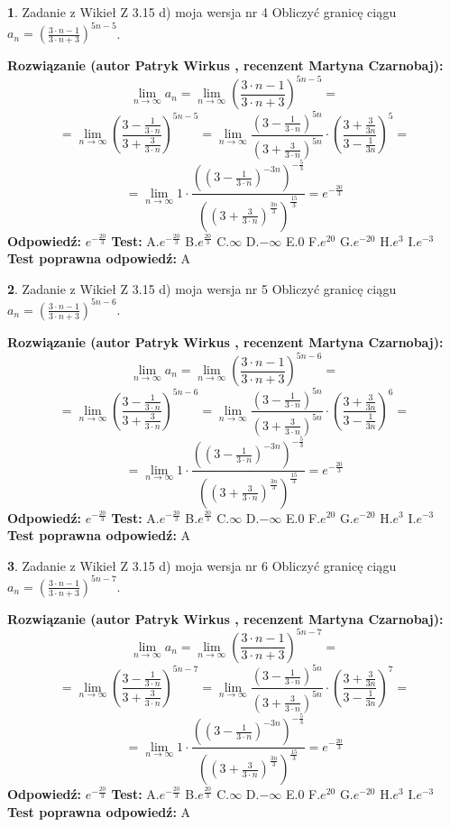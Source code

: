 \documentclass[12pt, a4paper]{article}
\theoremstyle{definition} %
\newtheorem{zad}{}
\newcommand{\zadStart}[1]{\begin{zad}#1\newline}
\newcommand{\zadStop}{\end{zad}}
\newcommand{\rozwStart}[2]{\noindent \textbf{Rozwiązanie (autor #1 , recenzent #2): }\newline}
\newcommand{\rozwStop}{\newline}
\newcommand{\odpStart}{\noindent \textbf{Odpowiedź:}\newline}
\newcommand{\odpStop}{\newline}
\newcommand{\testStart}{\noindent \textbf{Test:}\newline}
\newcommand{\testStop}{\newline}
\newcommand{\kluczStart}{\noindent \textbf{Test poprawna odpowiedź:}\newline}
\newcommand{\kluczStop}{\newline}
\begin{document}
\zadStart{Zadanie z Wikieł Z 3.15 d) moja wersja nr 4}
Obliczyć granicę ciągu $a_{n}=(\frac{3\cdot n - 1}{3 \cdot n + 3})^{5n-5}$.
\zadStop
\rozwStart{Patryk Wirkus}{Martyna Czarnobaj}
$$\lim\limits_{n\to\infty} a_{n} = \lim\limits_{n\to\infty}(\frac{3\cdot n - 1}{3 \cdot n + 3})^{5n-5}=$$
$$=\lim\limits_{n\to\infty}(\frac{3 - \frac{1}{3\cdot n}}{3 + \frac{3}{3 \cdot n}})^{5n-5}=\lim\limits_{n\to\infty}\frac{(3 - \frac{1}{3\cdot n})^{5n}}{(3 + \frac{3}{3\cdot n})^{5n}} \cdot (\frac{3+\frac{3}{3n}}{3-\frac{1}{3n}})^{5}=$$
$$=\lim\limits_{n\to\infty} 1 \cdot \frac{((3-\frac{1}{3 \cdot n})^{-3n})^{-\frac{5}{3}}}{((3+\frac{3}{3 \cdot n})^{\frac{3n}{3}})^{\frac{15}{3}}} =e^{-\frac{20}{3}}$$
\rozwStop
\odpStart
$e^{-\frac{20}{3}}$
\odpStop
\testStart
A.$ e^{-\frac{20}{3}}$
B.$ e^{\frac{20}{3}}$
C.$\infty$
D.$-\infty$
E.$0$
F.$e^{20}$
G.$e^{-20}$
H.$e^{3}$
I.$e^{-3}$
\testStop
\kluczStart
A
\kluczStop



\zadStart{Zadanie z Wikieł Z 3.15 d) moja wersja nr 5}
Obliczyć granicę ciągu $a_{n}=(\frac{3\cdot n - 1}{3 \cdot n + 3})^{5n-6}$.
\zadStop
\rozwStart{Patryk Wirkus}{Martyna Czarnobaj}
$$\lim\limits_{n\to\infty} a_{n} = \lim\limits_{n\to\infty}(\frac{3\cdot n - 1}{3 \cdot n + 3})^{5n-6}=$$
$$=\lim\limits_{n\to\infty}(\frac{3 - \frac{1}{3\cdot n}}{3 + \frac{3}{3 \cdot n}})^{5n-6}=\lim\limits_{n\to\infty}\frac{(3 - \frac{1}{3\cdot n})^{5n}}{(3 + \frac{3}{3\cdot n})^{5n}} \cdot (\frac{3+\frac{3}{3n}}{3-\frac{1}{3n}})^{6}=$$
$$=\lim\limits_{n\to\infty} 1 \cdot \frac{((3-\frac{1}{3 \cdot n})^{-3n})^{-\frac{5}{3}}}{((3+\frac{3}{3 \cdot n})^{\frac{3n}{3}})^{\frac{15}{3}}} =e^{-\frac{20}{3}}$$
\rozwStop
\odpStart
$e^{-\frac{20}{3}}$
\odpStop
\testStart
A.$ e^{-\frac{20}{3}}$
B.$ e^{\frac{20}{3}}$
C.$\infty$
D.$-\infty$
E.$0$
F.$e^{20}$
G.$e^{-20}$
H.$e^{3}$
I.$e^{-3}$
\testStop
\kluczStart
A
\kluczStop



\zadStart{Zadanie z Wikieł Z 3.15 d) moja wersja nr 6}
Obliczyć granicę ciągu $a_{n}=(\frac{3\cdot n - 1}{3 \cdot n + 3})^{5n-7}$.
\zadStop
\rozwStart{Patryk Wirkus}{Martyna Czarnobaj}
$$\lim\limits_{n\to\infty} a_{n} = \lim\limits_{n\to\infty}(\frac{3\cdot n - 1}{3 \cdot n + 3})^{5n-7}=$$
$$=\lim\limits_{n\to\infty}(\frac{3 - \frac{1}{3\cdot n}}{3 + \frac{3}{3 \cdot n}})^{5n-7}=\lim\limits_{n\to\infty}\frac{(3 - \frac{1}{3\cdot n})^{5n}}{(3 + \frac{3}{3\cdot n})^{5n}} \cdot (\frac{3+\frac{3}{3n}}{3-\frac{1}{3n}})^{7}=$$
$$=\lim\limits_{n\to\infty} 1 \cdot \frac{((3-\frac{1}{3 \cdot n})^{-3n})^{-\frac{5}{3}}}{((3+\frac{3}{3 \cdot n})^{\frac{3n}{3}})^{\frac{15}{3}}} =e^{-\frac{20}{3}}$$
\rozwStop
\odpStart
$e^{-\frac{20}{3}}$
\odpStop
\testStart
A.$ e^{-\frac{20}{3}}$
B.$ e^{\frac{20}{3}}$
C.$\infty$
D.$-\infty$
E.$0$
F.$e^{20}$
G.$e^{-20}$
H.$e^{3}$
I.$e^{-3}$
\testStop
\kluczStart
A
\kluczStop
\end{document}
